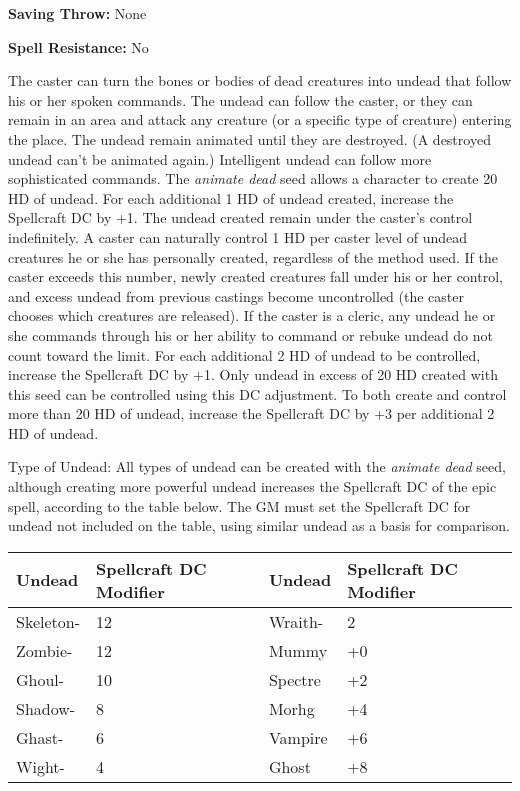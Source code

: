 \documentclass{article}
\begin{document}
\textbf{Saving Throw:} None 

\textbf{Spell Resistance:} No 

The caster can turn the bones or bodies of dead creatures into undead that follow 
his or her spoken commands. The undead can follow the caster, or they can remain 
in an area and attack any creature (or a specific type of creature) entering the 
place. The undead remain animated until they are destroyed. (A destroyed undead 
can't be animated again.) Intelligent undead can follow more sophisticated commands. 
The \textit{animate dead }seed allows a character to create 20 HD of undead. For 
each additional 1 HD of undead created, increase the Spellcraft DC by +1. The undead 
created remain under the caster's control indefinitely. A caster can naturally 
control 1 HD per caster level of undead creatures he or she has personally created, 
regardless of the method used. If the caster exceeds this number, newly created 
creatures fall under his or her control, and excess undead from previous castings 
become uncontrolled (the caster chooses which creatures are released). If the caster 
is a cleric, any undead he or she commands through his or her ability to command 
or rebuke undead do not count toward the limit. For each additional 2 HD of undead 
to be controlled, increase the Spellcraft DC by +1. Only undead in excess of 20 
HD created with this seed can be controlled using this DC adjustment. To both create 
and control more than 20 HD of undead, increase the Spellcraft DC by +3 per additional 
2 HD of undead. 

Type of Undead: All types of undead can be created with the \textit{animate dead 
}seed, although creating more powerful undead increases the Spellcraft DC of the 
epic spell, according to the table below. The GM must set the Spellcraft DC for 
undead not included on the table, using similar undead as a basis for comparison. 

\begin{tabular}{|>{\raggedright}p{42pt}|>{\raggedright}p{70pt}|>{\raggedright}p{40pt}|>{\raggedright}p{60pt}|}
\hline
U\textbf{ndead} & S\textbf{pellcraft DC Modifier} & U\textbf{ndead} & S\textbf{pellcraft 
DC Modifier}\tabularnewline
\hline
Skeleton- & 12 & Wraith- & 2\tabularnewline
\hline
Zombie- & 12 & Mummy & +0\tabularnewline
\hline
Ghoul- & 10 & Spectre & +2\tabularnewline
\hline
Shadow- & 8 & Morhg & +4\tabularnewline
\hline
Ghast- & 6 & Vampire & +6\tabularnewline
\hline
Wight- & 4 & Ghost & +8\tabularnewline
\hline
\end{tabular}
\end{document}
